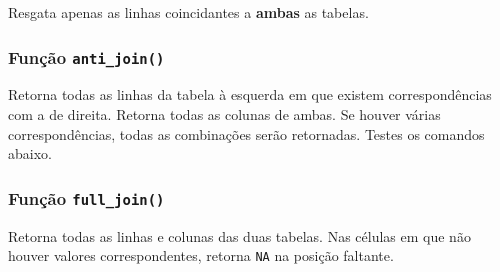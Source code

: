 \documentclass[
]{book}
\newenvironment{Shaded}{\begin{snugshade}}{\end{snugshade}}
\newcommand{\DataTypeTok}[1]{\textcolor[rgb]{0.13,0.29,0.53}{#1}}
\newcommand{\KeywordTok}[1]{\textcolor[rgb]{0.13,0.29,0.53}{\textbf{#1}}}
\newcommand{\NormalTok}[1]{#1}
\newcommand{\OperatorTok}[1]{\textcolor[rgb]{0.81,0.36,0.00}{\textbf{#1}}}
\newcommand{\StringTok}[1]{\textcolor[rgb]{0.31,0.60,0.02}{#1}}
\begin{document}
Resgata apenas as linhas coincidantes a \textbf{ambas} as tabelas.

\begin{Shaded}
\end{Shaded}

\hypertarget{funuxe7uxe3o-anti_join}{%
\subsubsection{\texorpdfstring{Função \texttt{anti\_join()}}{Função anti\_join()}}\label{funuxe7uxe3o-anti_join}}

Retorna todas as linhas da tabela à esquerda em que existem correspondências com a de direita. Retorna todas as colunas de ambas. Se houver várias correspondências, todas as combinações serão retornadas. Testes os comandos abaixo.

\begin{Shaded}
\end{Shaded}

\begin{Shaded}
\end{Shaded}

\hypertarget{funuxe7uxe3o-full_join}{%
\subsubsection{\texorpdfstring{Função \texttt{full\_join()}}{Função full\_join()}}\label{funuxe7uxe3o-full_join}}

Retorna todas as linhas e colunas das duas tabelas. Nas células em que não houver valores correspondentes, retorna \texttt{NA} na posição faltante.

\begin{Shaded}
\end{Shaded}
\end{document}
